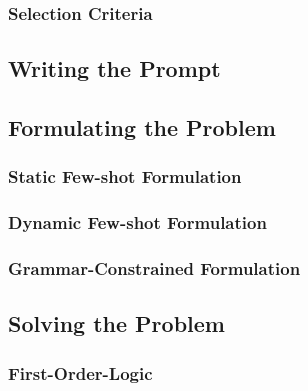 \documentclass[conference]{IEEEtran}
\begin{document}
\subsubsection*{Selection Criteria}

\subsection{Writing the Prompt}

\subsection{Formulating the Problem}
\subsubsection{Static Few-shot Formulation}

\subsubsection{Dynamic Few-shot Formulation}

\subsubsection{Grammar-Constrained Formulation}



\subsection{Solving the Problem}
\subsubsection*{First-Order-Logic}
\end{document}
